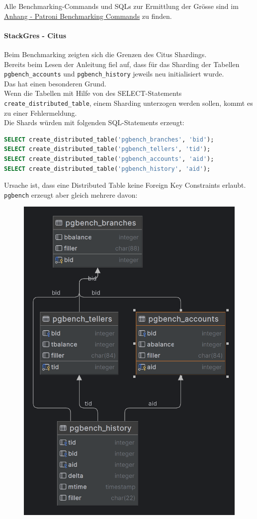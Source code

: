 \begin{flushleft}
    Alle Benchmarking-Commands und SQLs zur Ermittlung der Grösse sind im \hyperref[subsec:patroni_benchmarking_commands]{Anhang - Patroni Benchmarking Commands} zu finden.
\end{flushleft}
\begin{flushleft}
    \paragraph{StackGres - Citus}
    Beim Benchmarking zeigten sich die Grenzen des Citus Shardings.\\
    Bereits beim Lesen der Anleitung fiel auf, dass für das Sharding der Tabellen \texttt{pgbench\_accounts} und \texttt{pgbench\_history} jeweils neu initialisiert wurde\cite{6CJFR7RM}.\\
    Das hat einen besonderen Grund.\\
    Wenn die Tabellen mit Hilfe von des SELECT-Statements \texttt{create\_distributed\_table}, einem Sharding unterzogen werden sollen, kommt es zu einer Fehlermeldung.\\
    Die Shards würden mit folgenden SQL-Statements erzeugt:
\lstset{style=gra_codestyle}
\begin{lstlisting}[language=sql, caption=Citus - Benchmarking - Distributed Table Sharding,captionpos=b,label={lst:benchmarking_distributed_table_sharding},breaklines=true]
SELECT create_distributed_table('pgbench_branches', 'bid');
SELECT create_distributed_table('pgbench_tellers', 'tid');
SELECT create_distributed_table('pgbench_accounts', 'aid');
SELECT create_distributed_table('pgbench_history', 'aid');
\end{lstlisting}
    Ursache ist, dass eine Distributed Table keine Foreign Key Constraints erlaubt.\\
    \texttt{pgbench} erzeugt aber gleich mehrere davon:\\
    \begin{figure}[H]
        \centering
        \includegraphics[width=0.5\linewidth]{source/implementation/evaluation/benchmarking/stackgres_citus/pgbench_accounts}

\end{figure}
\end{flushleft}
